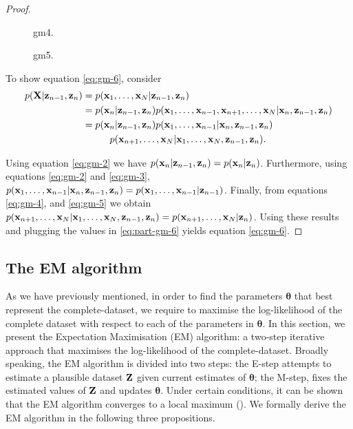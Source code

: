 \documentclass[11pt]{article}
\numberwithin{equation}{section}
\newcommand{\x}{{\bf x}}
\newcommand{\X}{{\bf X}}
\newcommand{\z}{{\bf z}}
\newcommand{\Z}{{\bf Z}}
\begin{document}
\begin{proof}
	\begin{figure}[h!]
		\centering
		\resizebox{\columnwidth}{!}{}
		\caption{gm4.}
		\label{fig:gm-4}
	\end{figure}
	
	\begin{figure}[h!]
		\centering
		\resizebox{\columnwidth}{!}{}
		\caption{gm5.}
		\label{fig:gm-5}
	\end{figure}
	
	To show equation \eqref{eq:gm-6}, consider
	\begin{align}
		p(\X \vert \z_{n-1}, \z_n) &= p(\x_1, \ldots, \x_N \vert \z_{n-1},\z_n)\\
		 &= p(\x_n \vert \z_{n-1}, \z_n) p(\x_1, \ldots, \x_{n-1}, \x_{n+1}, \ldots, \x_N \vert \x_n, \z_{n-1}, \z_n)\\
		&= p(\x_n \vert \z_{n-1}, \z_n) p(\x_1, \ldots, \x_{n-1} \vert \x_n, \z_{n-1}, \z_n) \nonumber\\
			&\hspace{1cm} p(\x_{n+1}, \ldots, \x_N \vert \x_1, \ldots, \x_N, \z_{n-1}, \z_n). \label{eq:part-gm-6}
	\end{align}
	
	Using equation \eqref{eq:gm-2} we have $p(\x_n \vert \z_{n-1}, \z_n) = p(\x_n \vert \z_n)$. Furthermore, using equations \eqref{eq:gm-2} and \eqref{eq:gm-3}, $p(\x_1, \ldots, \x_{n-1} \vert \x_n, \z_{n-1}, \z_n) = p(\x_1, \ldots, \x_{n-1} \vert \z_{n-1})$. Finally, from equations \eqref{eq:gm-4}, and \eqref{eq:gm-5} we obtain  $p(\x_{n+1}, \ldots, \x_N \vert \x_1, \ldots, \x_N, \z_{n-1}, \z_n) = p(\x_{n+1}, \ldots, \x_N \vert  \z_{n})$. Using these results and plugging the values in \eqref{eq:part-gm-6} yields equation \eqref{eq:gm-6}.
\end{proof}


\subsection{The EM algorithm}

As we have previously mentioned, in order to find the parameters $\boldsymbol{\theta}$ that best represent the complete-dataset, we require to maximise the log-likelihood of the complete dataset with respect to each of the parameters in $\boldsymbol{\theta}$. In this section, we present the Expectation Maximisation (EM) algorithm: a two-step iterative approach that maximises the log-likelihood of the complete-dataset. Broadly speaking, the EM algorithm is divided into two steps: the E-step attempts to estimate a plausible dataset $\Z$ given current estimates of $\boldsymbol\theta$; the M-step, fixes the estimated values of $\Z$ and updates $\boldsymbol{\theta}$. Under certain conditions, it can be shown that the EM algorithm converges to a local maximum (\cite{pml1Book}). We formally derive the EM algorithm in the following three propositions.
\end{document}
